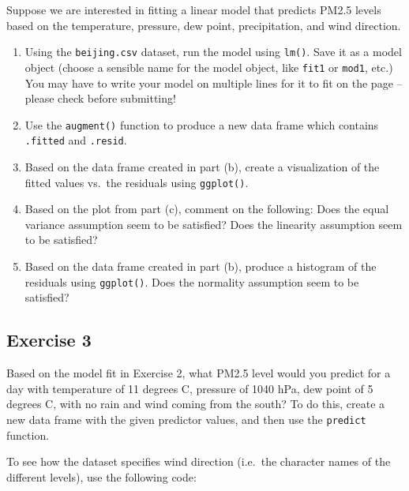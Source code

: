 \documentclass[
  letterpaper,
  DIV=11,
  numbers=noendperiod]{scrartcl}
\newenvironment{Shaded}{\begin{snugshade}}{\end{snugshade}}
\newcommand{\FunctionTok}[1]{\textcolor[rgb]{0.28,0.35,0.67}{#1}}
\newcommand{\NormalTok}[1]{\textcolor[rgb]{0.00,0.23,0.31}{#1}}
\newcommand{\SpecialCharTok}[1]{\textcolor[rgb]{0.37,0.37,0.37}{#1}}
\begin{document}
Suppose we are interested in fitting a linear model that predicts PM2.5
levels based on the temperature, pressure, dew point, precipitation, and
wind direction.

\begin{enumerate}
\def\labelenumi{\alph{enumi}.}
\item
  Using the \texttt{beijing.csv} dataset, run the model using
  \texttt{lm()}. Save it as a model object (choose a sensible name for
  the model object, like \texttt{fit1} or \texttt{mod1}, etc.) You may
  have to write your model on multiple lines for it to fit on the page
  -- please check before submitting!
\item
  Use the \texttt{augment()} function to produce a new data frame which
  contains \texttt{.fitted} and \texttt{.resid}.
\item
  Based on the data frame created in part (b), create a visualization of
  the fitted values vs.~the residuals using \texttt{ggplot()}.
\item
  Based on the plot from part (c), comment on the following: Does the
  equal variance assumption seem to be satisfied? Does the linearity
  assumption seem to be satisfied?
\item
  Based on the data frame created in part (b), produce a histogram of
  the residuals using \texttt{ggplot()}. Does the normality assumption
  seem to be satisfied?
\end{enumerate}

\subsection{Exercise 3}\label{exercise-3}

Based on the model fit in Exercise 2, what PM2.5 level would you predict
for a day with temperature of 11 degrees C, pressure of 1040 hPa, dew
point of 5 degrees C, with no rain and wind coming from the south? To do
this, create a new data frame with the given predictor values, and then
use the \texttt{predict} function.

\begin{tcolorbox}[enhanced jigsaw, arc=.35mm, bottomrule=.15mm, bottomtitle=1mm, breakable, colback=white, colbacktitle=quarto-callout-tip-color!10!white, colframe=quarto-callout-tip-color-frame, coltitle=black, left=2mm, leftrule=.75mm, opacityback=0, opacitybacktitle=0.6, rightrule=.15mm, title=\textcolor{quarto-callout-tip-color}{\faLightbulb}\hspace{0.5em}{Hint}, titlerule=0mm, toprule=.15mm, toptitle=1mm]

To see how the dataset specifies wind direction (i.e.~the character
names of the different levels), use the following code:

\begin{Shaded}
\end{Shaded}

\end{tcolorbox}
\end{document}
